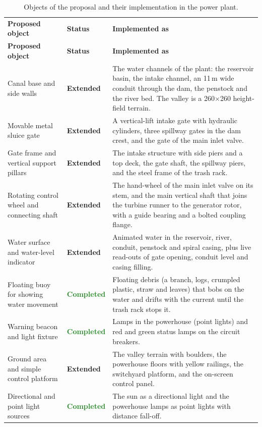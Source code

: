 \documentclass[11pt,a4paper]{report}
\newcommand{\thickhline}{\noalign{\global\setlength{\arrayrulewidth}{0.9pt}}\hline
                         \noalign{\global\setlength{\arrayrulewidth}{0.4pt}}}
\newcommand{\toprule}{\thickhline\noalign{\vskip 2pt}}
\newcommand{\midrule}{\noalign{\vskip 1pt}\hline\noalign{\vskip 2pt}}
\newcommand{\bottomrule}{\noalign{\vskip 1pt}\thickhline}
\newcommand{\done}{\textcolor{ForestGreen}{\textbf{Completed}}}
\newcommand{\ext}{\textcolor{accent}{\textbf{Extended}}}
\begin{document}
\begingroup\small
\begin{longtable}{@{}L{3.5cm}L{2.15cm}L{\dimexpr\textwidth-3.5cm-2.15cm-4\tabcolsep\relax}@{}}
\caption{Objects of the proposal and their implementation in the power plant.}\label{tab:objects}\\
\toprule
\textbf{Proposed object} & \textbf{Status} & \textbf{Implemented as} \\
\midrule
\endfirsthead
\toprule
\textbf{Proposed object} & \textbf{Status} & \textbf{Implemented as} \\
\midrule
\endhead
\bottomrule
\endlastfoot
Canal base and side walls & \ext &
  The water channels of the plant: the reservoir basin, the intake channel, an 11\,m
  wide conduit through the dam, the penstock and the river bed. The valley is a
  260$\times$260 height-field terrain. \\
Movable metal sluice gate & \ext &
  A vertical-lift intake gate with hydraulic cylinders, three spillway gates in the
  dam crest, and the gate of the main inlet valve. \\
Gate frame and vertical support pillars & \ext &
  The intake structure with side piers and a top deck, the gate shaft, the spillway
  piers, and the steel frame of the trash rack. \\
Rotating control wheel and connecting shaft & \ext &
  The hand-wheel of the main inlet valve on its stem, and the main vertical shaft
  that joins the turbine runner to the generator rotor, with a guide bearing and a
  bolted coupling flange. \\
Water surface and water-level indicator & \ext &
  Animated water in the reservoir, river, conduit, penstock and spiral casing, plus
  live read-outs of gate opening, conduit level and casing filling. \\
Floating buoy for showing water movement & \done &
  Floating debris (a branch, logs, crumpled plastic, straw and leaves) that bobs on the
  water and drifts with the current until the trash rack stops it. \\
Warning beacon and light fixture & \done &
  Lamps in the powerhouse (point lights) and red and green status lamps on the circuit
  breakers. \\
Ground area and simple control platform & \ext &
  The valley terrain with boulders, the powerhouse floors with yellow railings, the
  switchyard platform, and the on-screen control panel. \\
Directional and point light sources & \done &
  The sun as a directional light and the powerhouse lamps as point lights with distance
  fall-off. \\
\end{longtable}
\endgroup
\end{document}
